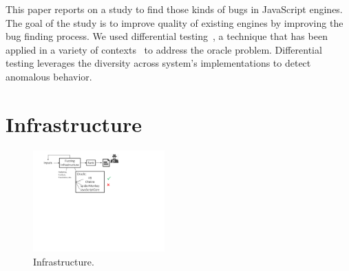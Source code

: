 \documentclass[10pt,conference,anonymous]{IEEEtran}
\begin{document}
This paper reports on a study to find those kinds of bugs in
JavaScript engines. The goal of the study is to improve quality of
existing \js{} engines by improving the bug finding process. We used
differential testing~\cite{Brumley-etal-ss07}, a technique that has
been applied in a variety of
contexts~\cite{Yang-etal-pldi11,Chen-etal-fse2015,Argyros-etla-ccs16,Chen-etal-pldi16,petsios-etal-sp2017,SivakornAPKJ17}
to address the oracle problem. Differential testing leverages the
diversity across system's implementations to detect anomalous
behavior. 

\section{Infrastructure}
\label{sec:design}


\begin{figure}[h]
  \centering
  \includegraphics[trim=20 350 200 0,clip,width=0.45\textwidth]{google-awards-workflow}
  \caption{\label{fig:workflow}Infrastructure.}
\end{figure}
\end{document}
